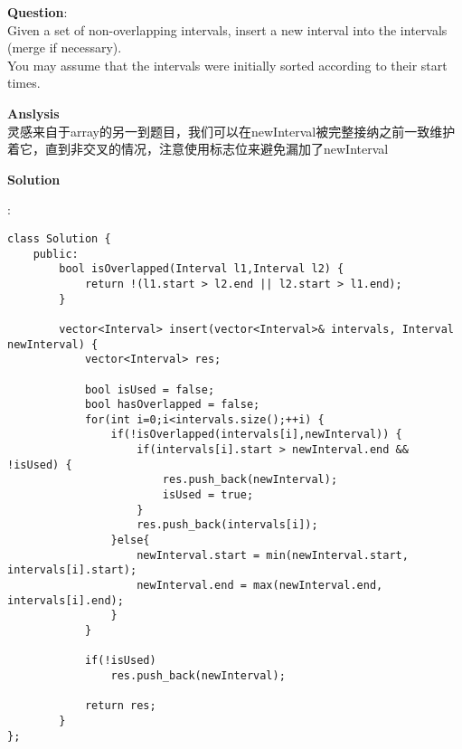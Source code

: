     
\begin{description}
    \item{\textbf{Question}}:\\%
		Given a set of non-overlapping intervals, insert a new interval into the intervals (merge if necessary).\\
		You may assume that the intervals were initially sorted according to their start times.\\

    \item{\textbf{Anslysis}}\\
		灵感来自于array的另一到题目，我们可以在newInterval被完整接纳之前一致维护着它，直到非交叉的情况，注意使用标志位来避免漏加了newInterval\\

    \item{\textbf{Solution}}\\
	\item{} : \\
		\begin{lstlisting}
class Solution {
	public:
		bool isOverlapped(Interval l1,Interval l2) {
			return !(l1.start > l2.end || l2.start > l1.end);
		}

		vector<Interval> insert(vector<Interval>& intervals, Interval newInterval) {
			vector<Interval> res;

			bool isUsed = false;
			bool hasOverlapped = false;
			for(int i=0;i<intervals.size();++i) {
				if(!isOverlapped(intervals[i],newInterval)) {
					if(intervals[i].start > newInterval.end && !isUsed) {
						res.push_back(newInterval);
						isUsed = true;
					}
					res.push_back(intervals[i]);
				}else{
					newInterval.start = min(newInterval.start, intervals[i].start);
					newInterval.end = max(newInterval.end, intervals[i].end);
				}
			}

			if(!isUsed)
				res.push_back(newInterval);

			return res;
		}
};
		\end{lstlisting}

\end{description}

